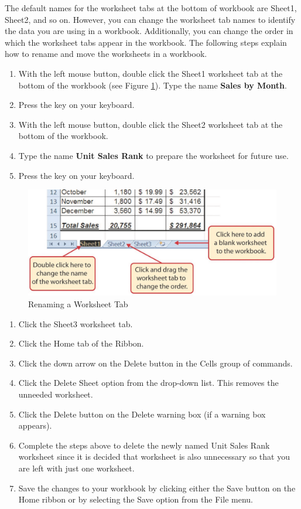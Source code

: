 The default names for the worksheet tabs at the bottom of workbook are Sheet1, Sheet2, and so on. However, you can change the worksheet tab names to identify the data you are using in a workbook. Additionally, you can change the order in which the worksheet tabs appear in the workbook. The following steps explain how to rename and move the worksheets in a workbook.

\begin{enumerate}
	\item With the left mouse button, double click the Sheet1 worksheet tab at the bottom of the workbook (see Figure \ref{01:fig47}). Type the name \textbf{Sales by Month}.
	\item Press the  key on your keyboard.
	\item With the left mouse button, double click the Sheet2 worksheet tab at the bottom of the workbook.
	\item Type the name \textbf{Unit Sales Rank} to prepare the worksheet for future use.
	\item Press the  key on your keyboard.
\end{enumerate}

\begin{figure}[H]
	\centering
	\includegraphics[width=\maxwidth{.95\linewidth}]{gfx/ch01_fig47}
	\caption{Renaming a Worksheet Tab}
	\label{01:fig47}
\end{figure}

\begin{enumerate}
	\item Click the Sheet3 worksheet tab.
	\item Click the Home tab of the Ribbon.
	\item Click the down arrow on the Delete button in the Cells group of commands.
	\item Click the Delete Sheet option from the drop-down list. This removes the unneeded worksheet.
	\item Click the Delete button on the Delete warning box (if a warning box appears).
	\item Complete the steps above to delete the newly named Unit Sales Rank worksheet since it is decided that worksheet is also unnecessary so that you are left with just one worksheet.
	\item Save the changes to your workbook by clicking either the Save button on the Home ribbon or by selecting the Save option from the File menu.
\end{enumerate}

